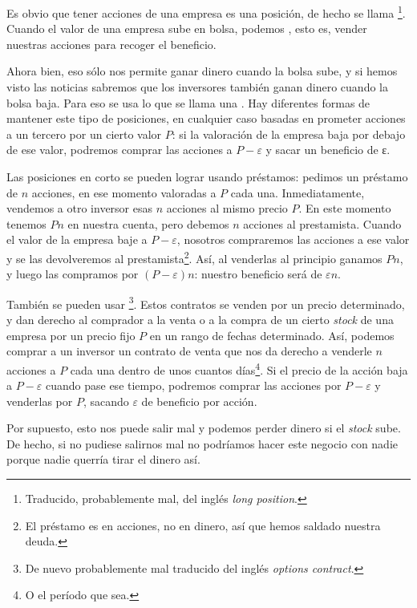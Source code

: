 \documentclass[nochap,palatino,notitlepage]{apuntes}
\begin{document}
Es obvio que tener acciones de una empresa es una posición, de hecho se llama \footnote{Traducido, probablemente mal, del inglés \textit{long position}.}. Cuando el valor de una empresa sube en bolsa, podemos , esto es, vender nuestras acciones para recoger el beneficio.

Ahora bien, eso sólo nos permite ganar dinero cuando la bolsa sube, y si hemos visto las noticias sabremos que los inversores también ganan dinero cuando la bolsa baja. Para eso se usa lo que se llama una . Hay diferentes formas de mantener este tipo de posiciones, en cualquier caso basadas en prometer acciones a un tercero por un cierto valor $P$: si la valoración de la empresa baja por debajo de ese valor, podremos comprar las  acciones a $P - ε$ y sacar un beneficio de ε.

Las posiciones en corto se pueden lograr usando préstamos: pedimos un préstamo de $n$ acciones, en ese momento valoradas a $P$ cada una. Inmediatamente, vendemos a otro inversor esas $n$ acciones al mismo precio $P$. En este momento tenemos $Pn$ en nuestra cuenta, pero debemos $n$ acciones al prestamista. Cuando el valor de la empresa baje a $P-ε$, nosotros compraremos las acciones a ese valor y se las devolveremos al prestamista\footnote{El préstamo es en acciones, no en dinero, así que hemos saldado nuestra deuda.}. Así, al venderlas al principio ganamos $Pn$, y luego las compramos por $(P-ε)n$: nuestro beneficio será de $εn$.

También se pueden usar \footnote{De nuevo probablemente mal traducido del inglés \textit{options contract}.}. Estos contratos se venden por un precio determinado, y dan derecho al comprador a la venta o a la compra de un cierto \textit{stock} de una empresa por un precio fijo $P$ en un rango de fechas determinado. Así, podemos comprar a un inversor un contrato de venta que nos da derecho a venderle $n$ acciones a $P$ cada una dentro de unos cuantos días\footnote{O el período que sea.}. Si el precio de la acción baja a $P - ε$ cuando pase ese tiempo, podremos comprar las acciones por $P - ε$ y venderlas por $P$, sacando $ε$ de beneficio por acción.

Por supuesto, esto nos puede salir mal y podemos perder dinero si el \textit{stock} sube. De hecho, si no pudiese salirnos mal no podríamos hacer este negocio con nadie porque nadie querría tirar el dinero así.
\end{document}
